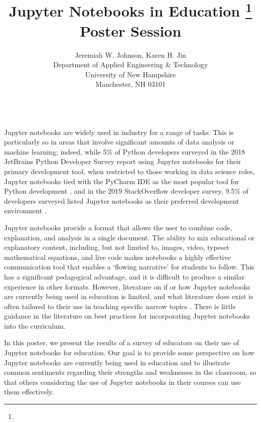 \documentclass{article}
\title{Jupyter Notebooks in Education \footnote{\protect}\\
\vspace{0.2in}
\large Poster Session\\}
\author{
Jeremiah W. Johnson, Karen H. Jin\\
Department of Applied Engineering \& Technology \\
University of New Hampshire \\
Manchester, NH 03101 \\
\email{\{Jeremiah.Johnson, Karen.Jin\}@unh.edu}\\
}
\begin{document}
\maketitle

Jupyter notebooks are widely used in industry for a range of tasks.  This is particularly so in areas that involve significant amounts of data analysis or machine learning; indeed, while 5\% of Python developers surveyed in the 2018 JetBrains Python Developer Survey report using Jupyter notebooks for their primary development tool, when restricted to those working in data science roles, Jupyter notebooks tied with the PyCharm IDE as the most popular tool for Python development \cite{jetbrains2018dev}, and in the 2019 StackOverflow developer survey, 9.5\% of developers surveyed listed Jupyter notebooks as their preferred development environment \cite{stackoverflow2019dev}.  

Jupyter notebooks provide a format that allows the user to combine code, explanation, and analysis in a single document. The ability to mix educational or explanatory content, including, but not limited to, images, video, typeset mathematical equations, and live code makes notebooks a highly effective communication tool that enables a `flowing narrative' for students to follow. This has a significant pedagogical advantage, and it is difficult to produce a similar experience in other formats. However, literature on if or how Jupyter notebooks are currently being used in education is limited, and what literature does exist is often tailored to their use in teaching specific narrow topics \cite{DePratti:2019:UJN:3344051.3344077,Glick:2018:UJN:3280489.3280518}. There is little guidance in the literature on best practices for incorporating Jupyter notebooks into the curriculum.

In this poster, we present the results of a survey of educators on their use of Jupyter notebooks for education. Our goal is to provide some perspective on how Jupyter notebooks are currently being used in education and to illustrate common sentiments regarding their strengths and weaknesses in the classroom, so that others considering the use of Jupyter notebooks in their courses can use them effectively.


\small{

}
\end{document}
